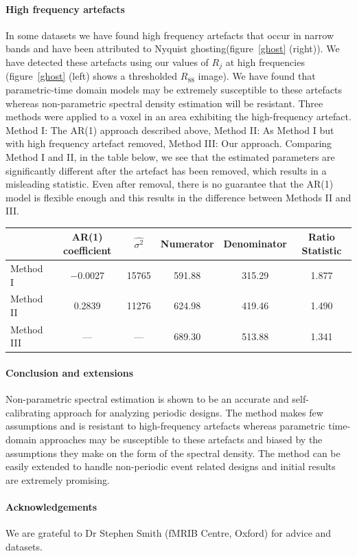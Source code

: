 \documentclass[a0,portrait]{a0poster}
\begin{document}
\begin{center}
{\paragraph{High frequency artefacts}
In some datasets we have found high frequency artefacts that occur in narrow bands and have been attributed to Nyquist ghosting(figure~\ref{ghost} (right)). We have detected these artefacts using our values of $R_j$ at high frequencies (figure~\ref{ghost} (left) shows a thresholded $R_{88}$ image).
We have found that parametric-time domain models may be extremely susceptible to these artefacts whereas non-parametric spectral density estimation will be resistant. Three methods were applied to a voxel in an area exhibiting the high-frequency artefact. Method I: The AR(1) approach described above, Method II: As Method I but with high frequency artefact removed, Method III: Our approach. Comparing Method I and II, in the table below, we see that the estimated parameters are significantly different after the artefact has been removed, which results in a misleading statistic. Even after removal, there is no guarantee that the AR(1) model is flexible enough and this results in the difference between Methods II and III.
\begin{center}
\small
\begin{tabular}{|l||c|c|c|c|c|}
\hline 
& AR(1) coefficient & $\widehat{\sigma^2}$ & Numerator & Denominator & Ratio Statistic\\
\hline \hline
Method I & $-$0.0027 & 15765 & 591.88 & 315.29 & 1.877\\
\hline
Method II & 0.2839 & 11276 & 624.98 & 419.46 & 1.490\\
\hline 
Method III& --- & --- & 689.30 & 513.88 & 1.341\\
\hline 
\end{tabular}
\end{center}
\paragraph{Conclusion and extensions}
Non-parametric spectral estimation is shown to be an accurate and self-calibrating approach for analyzing periodic designs. The method makes few assumptions and is resistant to high-frequency artefacts whereas parametric time-domain approaches may be susceptible to these artefacts and biased by the assumptions they make on the form of the spectral density. The method can be easily extended to handle non-periodic event related designs and initial results are extremely promising.
\paragraph{Acknowledgements} We are grateful to Dr Stephen Smith (fMRIB Centre, Oxford) for
advice and datasets.


}
\end{center}


\makefooter
\end{document}
